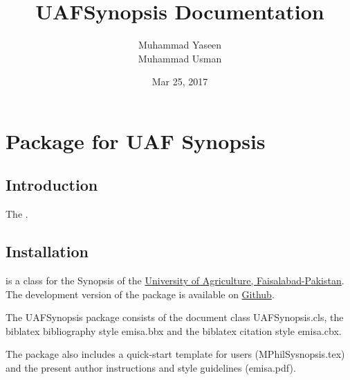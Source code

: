 \documentclass[letterpaper,10pt,english]{sphinxmanual}
\title{UAFSynopsis Documentation}
\date{Mar 25, 2017}
\author{Muhammad Yaseen\\Muhammad Usman}
\begin{document}
\maketitle
\sphinxtableofcontents
{}\label{\detokenize{index::doc}}



\chapter{ Package for UAF Synopsis}
\label{\detokenize{index:latex-package-for-uaf-synopsis}}\label{\detokenize{index:uafsynopsis-s-documentation}}

\section{Introduction}
\label{\detokenize{index:introduction}}
The .


\section{Installation}
\label{\detokenize{index:installation}}
 is a   class for the Synopsis of the \href{https://uaf.edu.pk}{University of Agriculture, Faisalabad-Pakistan}. The development version of the package is available on \href{https://github.com/MYaseen208/UAFSynopsis}{Github}.

The UAFSynopsis  package consists of the document class UAFSynopsis.cls, the biblatex bibliography style emisa.bbx and the biblatex citation style emisa.cbx.

The package also includes a quick-start template for users (MPhilSysnopsis.tex) and the
present author instructions and style guidelines (emisa.pdf).
\end{document}

